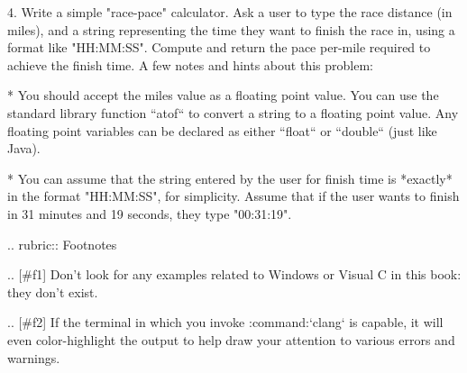 4.  Write a simple "race-pace" calculator.  Ask a user to type the race distance (in miles), and a string representing the time they want to finish the race in, using a format like "HH:MM:SS".  Compute and return the pace per-mile required to achieve the finish time.  A few notes and hints about this problem:

    * You should accept the miles value as a floating point value.  You can use the standard library function ``atof`` to convert a string to a floating point value.  Any floating point variables can be declared as either ``float`` or ``double`` (just like Java).

    * You can assume that the string entered by the user for finish time is *exactly* in the format "HH:MM:SS", for simplicity.  Assume that if the user wants to finish in 31 minutes and 19 seconds, they type "00:31:19".

.. rubric:: Footnotes

.. [#f1] Don't look for any examples related to Windows or Visual C in this book: they don't exist.

.. [#f2] If the terminal in which you invoke :command:`clang` is capable, it will even color-highlight the output to help draw your attention to various errors and warnings.  
